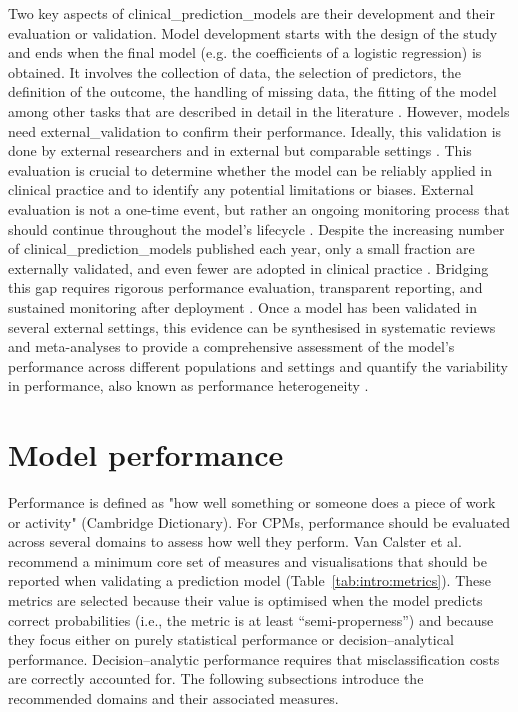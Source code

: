 Two key aspects of \glspl{clinical_prediction_model} are their development and their evaluation or validation. Model development starts with the design of the study and ends when the final model (e.g. the coefficients of a logistic regression) is obtained. It involves the collection of data, the selection of predictors, the definition of the outcome, the handling of missing data, the fitting of the model among other tasks that are described in detail in the literature \cite{efthimiou_developing_2024,wynantsKeyStepsCommon2017}. However, models need \gls{external_validation} to confirm their performance. Ideally, this validation is done by external researchers and in external but comparable settings \cite{gulatiGeneralizabilityCardiovascularDisease2022,siontisExternalValidationNew2015}. This evaluation is crucial to determine whether the model can be reliably applied in clinical practice and to identify any potential limitations or biases. External evaluation is not a one-time event, but rather an ongoing monitoring process that should continue throughout the model's lifecycle \cite{vancalsterThereNoSuch2023}. Despite the increasing number of \glspl{clinical_prediction_model} published each year, only a small fraction are externally validated, and even fewer are adopted in clinical practice \cite{bouwmeesterReportingMethodsClinical2012, collinsExternalValidationMultivariable2014,arshiNumberPublicationsNew2025}. Bridging this gap requires rigorous performance evaluation, transparent reporting, and sustained monitoring after deployment \cite{vancalsterThereNoSuch2023, van2026enemies}. Once a model has been validated in several external settings, this evidence can be synthesised in systematic reviews and meta-analyses to provide a comprehensive assessment of the model's performance across different populations and settings and quantify the variability in performance, also known as performance \gls{heterogeneity} \cite{snellTransparentReportingMultivariable2023}. 


\section{Model performance}

Performance is defined as "how well something or someone does a piece of work or activity" (Cambridge Dictionary). For \glspl{CPM}, performance should be evaluated across several domains to assess how well they perform. Van Calster et al.\ \cite{vancalsterPerformanceEvaluationPredictive2024} recommend a minimum core set of measures and visualisations that should be reported when validating a prediction model (Table~\ref{tab:intro:metrics}). These metrics are selected because their value is optimised when the model predicts correct probabilities (i.e., the metric is at least \enquote{semi-\gls{properness}}) and because they focus either on purely statistical performance or decision--analytical performance. Decision--analytic performance requires that misclassification costs are correctly accounted for. The following subsections introduce the recommended domains and their associated measures.

